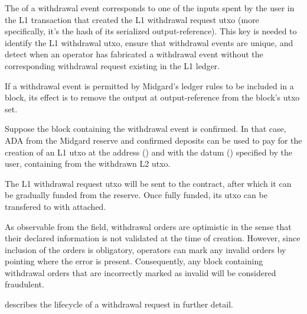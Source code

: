 \documentclass[../midgard.tex]{subfiles}
\begin{document}
The  of a withdrawal event corresponds to one of the inputs spent by the user in the L1 transaction that created the L1 withdrawal request utxo (more specifically, it's the hash of its serialized output-reference).
This key is needed to identify the L1 withdrawal utxo, ensure that withdrawal events are unique, and detect when an operator has fabricated a withdrawal event without the corresponding withdrawal request existing in the L1 ledger.

If a withdrawal event is permitted by Midgard's ledger rules to be included in a block, its effect is to remove the output at output-reference  from the block's utxo set.

Suppose the block containing the withdrawal event is confirmed.
In that case, ADA from the Midgard reserve and confirmed deposits can be used to pay for the creation of an L1 utxo at the address () and with the datum () specified by the user, containing  from the withdrawn L2 utxo.

The L1 withdrawal request utxo will be sent to the  contract, after which it can be gradually funded from the reserve. Once fully funded, its utxo can be transfered to  with  attached.

As observable from the  field, withdrawal orders are optimistic in the sense that their declared information is not validated at the time of creation.
However, since inclusion of the orders is obligatory, operators can mark any invalid orders by pointing where the error is present.
Consequently, any block containing withdrawal orders that are incorrectly marked as invalid will be considered fraudulent.

 describes the lifecycle of a withdrawal request in further detail.
\end{document}
